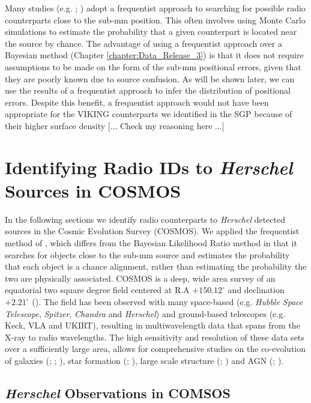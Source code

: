 Many studies (e.g. \citealt{Eales_2009}; \citealt{Dye_2009}) adopt a frequentist approach to searching for possible radio counterparts close to the sub-mm position. This often involves using Monte Carlo simulations to estimate the probability that a given counterpart is located near the source by chance. The advantage of using a frequentist approach over a Bayesian method (Chapter \ref{chapter:Data_Release_3}) is that it does not require assumptions to be made on the form of the sub-mm positional errors, given that they are poorly known due to source confusion. As will be shown later, we can use the results of a frequentist approach to infer the distribution of positional errors. Despite this benefit, a frequentist approach would not have been appropriate for the VIKING counterparts we identified in the SGP because of their higher surface density {\color{red}[... Check my reasoning here ...]} 

\section{Identifying Radio IDs to \textit{Herschel} Sources in COSMOS}

In the following sections we identify radio counterparts to \textit{Herschel} detected sources in the Cosmic Evolution Survey (COSMOS). We applied the frequentist method of \citealt{Lilly_1999}, which differs from the Bayesian Likelihood Ratio method in that it searches for objects close to the sub-mm source and estimates the probability that each object is a chance alignment, rather than estimating the probability the two are physically associated. COSMOS is a deep, wide area survey of an equatorial two square degree field centered at R.A $+150.12^{\circ}$ and declination $+2.21^{\circ}$ (\citealt{Scoville_2007}). The field has been observed with many space-based (e.g. \textit{Hubble Space Telescope}, \textit{Spitzer}, \textit{Chandra} and \textit{Herschel}) and ground-based telescopes (e.g. Keck, VLA and UKIRT), resulting in multiwavelength data that spans from the X-ray to radio wavelengths. The high sensitivity and resolution of these data sets over a sufficiently large area, allows for comprehensive studies on the co-evolution of galaxies (\citealt{Schreiber_2018}; \citealt{Stockmann_2020}; \citealt{Valentino_2020a}), star formation (\citealt{Gruppioni_2013}; \citealt{Novak_2017}), large scale structure (\citealt{Scoville_2013}; \citealt{Laigle_2018}) and AGN (\citealt{Prescott_2006}; \citealt{Heintz_2016}). 

\subsection{\textit{Herschel} Observations in COMSOS}

